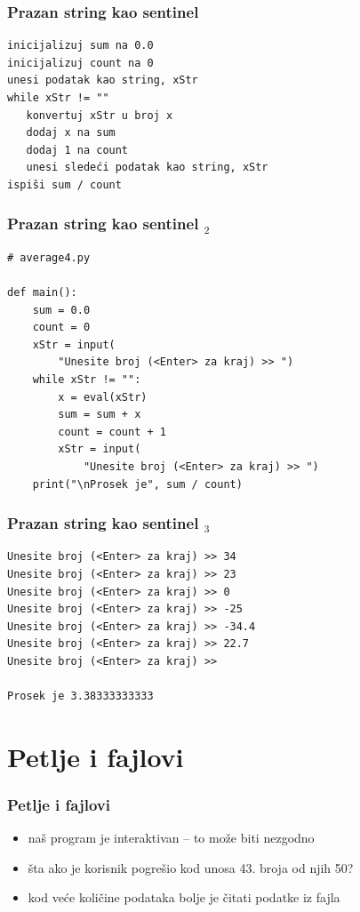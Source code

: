 \documentclass[utf8,compress]{beamer}
\begin{document}
\begin{frame}[fragile]
  \frametitle{Prazan string kao sentinel}
\begin{verbatim}
inicijalizuj sum na 0.0
inicijalizuj count na 0
unesi podatak kao string, xStr
while xStr != ""
   konvertuj xStr u broj x
   dodaj x na sum
   dodaj 1 na count
   unesi sledeći podatak kao string, xStr
ispiši sum / count
\end{verbatim}
\end{frame}

\begin{frame}[fragile]
  \frametitle{Prazan string kao sentinel $_2$}
\begin{verbatim}
# average4.py

def main():
    sum = 0.0
    count = 0
    xStr = input(
        "Unesite broj (<Enter> za kraj) >> ")
    while xStr != "":
        x = eval(xStr)
        sum = sum + x
        count = count + 1
        xStr = input(
            "Unesite broj (<Enter> za kraj) >> ")
    print("\nProsek je", sum / count)
\end{verbatim}
\end{frame}

\begin{frame}[fragile]
  \frametitle{Prazan string kao sentinel $_3$}
\begin{verbatim}
Unesite broj (<Enter> za kraj) >> 34
Unesite broj (<Enter> za kraj) >> 23
Unesite broj (<Enter> za kraj) >> 0
Unesite broj (<Enter> za kraj) >> -25
Unesite broj (<Enter> za kraj) >> -34.4
Unesite broj (<Enter> za kraj) >> 22.7
Unesite broj (<Enter> za kraj) >>

Prosek je 3.38333333333
\end{verbatim}
\end{frame}

\section[Fajlovi]{Petlje i fajlovi}

\begin{frame}[fragile]
  \frametitle{Petlje i fajlovi}
  \begin{itemize}
    \item naš program je interaktivan -- to može biti nezgodno
    \item šta ako je korisnik pogrešio kod unosa 43. broja od njih 50?
    \item kod veće količine podataka bolje je čitati podatke iz fajla
  \end{itemize}
\end{frame}
\end{document}
